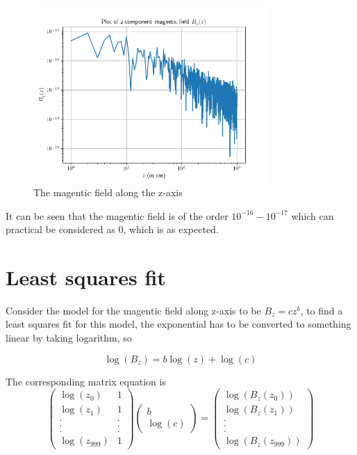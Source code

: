 \documentclass[12pt, a4paper]{article}
\begin{document}
\begin{figure}[H]
\centering
\includegraphics[width=0.8\textwidth]{Bzcos.png}
\caption{The magentic field along the z-axis}
\end{figure}

It can be seen that the magentic field is of the order $10^{-16}-10^{-17}$ which can practical be considered as 0, which is as expected.

\section{Least squares fit}

Consider the model for the magentic field along z-axis to be $B_z = cz^b$, to find a least squares fit for this model, the exponential has to be converted to something linear by taking logarithm, so

\begin{equation*}
\log(B_z) = b \log(z) + \log(c)
\end{equation*}

The corresponding matrix equation is
\begin{equation*}
\left( 
\begin{matrix}
\log(z_0) & 1 \\
\log(z_1) & 1 \\
. & . \\ 
. & . \\
. & . \\
\log(z_{999}) & 1  
\end{matrix}
\right)
\left(
\begin{matrix}
b \\
\log(c)
\end{matrix}
\right) = 
\left( 
\begin{matrix}
\log(B_z(z_0)) \\
\log(B_z(z_1)) \\
. \\ 
. \\
. \\
\log(B_z(z_{999}))
\end{matrix}
\right)
\end{equation*}
\end{document}
